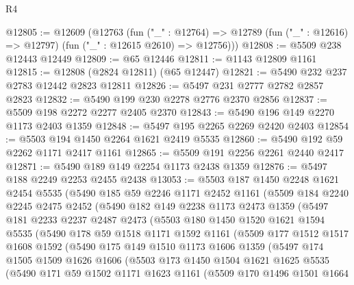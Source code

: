\begin{lexlean}{R4}
\begin{coremodule}
@12805 := @12609
    (@12763
      (fun ("_" : @12764) =>
      @12789 (fun ("_" : @12616) => @12797) (fun ("_" : @12615 @2610) => @12756)))
@12808 := @5509 @238 @12443 @12449
@12809 := @65 @12446
@12811 := @1143 @12809 @1161
@12815 := @12808 (@2824 @12811) (@65 @12447)
@12821 := @5490 @232 @237 @2783 @12442 @2823 @12811
@12826 := @5497 @231 @2777 @2782 @2857 @2823
@12832 := @5490 @199 @230 @2278 @2776 @2370 @2856
@12837 := @5509 @198 @2272 @2277 @2405 @2370
@12843 := @5490 @196 @149 @2270 @1173 @2403 @1359
@12848 := @5497 @195 @2265 @2269 @2420 @2403
@12854 := @5503 @194 @1450 @2264 @1621 @2419 @5535
@12860 := @5490 @192 @59 @2262 @1171 @2417 @1161
@12865 := @5509 @191 @2256 @2261 @2440 @2417
@12871 := @5490 @189 @149 @2254 @1173 @2438 @1359
@12876 := @5497 @188 @2249 @2253 @2455 @2438
@13053 := @5503
    @187
    @1450
    @2248
    @1621
    @2454
    @5535
    (@5490
      @185
      @59
      @2246
      @1171
      @2452
      @1161
      (@5509
        @184
        @2240
        @2245
        @2475
        @2452
        (@5490
          @182
          @149
          @2238
          @1173
          @2473
          @1359
          (@5497
            @181
            @2233
            @2237
            @2487
            @2473
            (@5503
              @180
              @1450
              @1520
              @1621
              @1594
              @5535
              (@5490
                @178
                @59
                @1518
                @1171
                @1592
                @1161
                (@5509
                  @177
                  @1512
                  @1517
                  @1608
                  @1592
                  (@5490
                    @175
                    @149
                    @1510
                    @1173
                    @1606
                    @1359
                    (@5497
                      @174
                      @1505
                      @1509
                      @1626
                      @1606
                      (@5503
                        @173
                        @1450
                        @1504
                        @1621
                        @1625
                        @5535
                        (@5490
                          @171
                          @59
                          @1502
                          @1171
                          @1623
                          @1161
                          (@5509
                            @170
                            @1496
                            @1501
                            @1664

\end{coremodule}
\end{lexlean}
